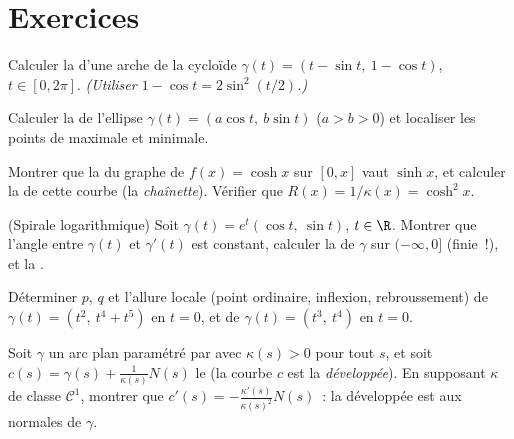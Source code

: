 \section{Exercices}

\begin{exercise}[$\star$]\label{exo:b2:curves:1}
Calculer la  d'une arche de la cycloïde $\gamma(t) = (t -
\sin t,\ 1 - \cos t)$, $t \in [0, 2\pi]$. \emph{(Utiliser $1 - \cos t =
2\sin^2(t/2)$.)}
\end{exercise}

\begin{exercise}[$\star$]\label{exo:b2:curves:2}
Calculer la  de l'ellipse $\gamma(t) = (a\cos t,\ b\sin
t)$ ($a > b > 0$) et localiser les points de  maximale et
minimale.
\end{exercise}

\begin{exercise}[$\star$]\label{exo:b2:curves:3}
Montrer que la  du graphe de $f(x) = \cosh x$ sur
$[0, x]$ vaut $\sinh x$, et calculer la  de cette
courbe (la \emph{chaînette}). Vérifier que $R(x) = 1/\kappa(x) =
\cosh^2 x$.
\end{exercise}

\begin{exercise}[$\star\star$]\label{exo:b2:curves:4}
(Spirale logarithmique) Soit $\gamma(t) = e^{t}(\cos t,\ \sin t)$, $t
\in \R$.
Montrer que l'angle entre $\gamma(t)$ et $\gamma'(t)$ est
constant, calculer la  de $\gamma$ sur $(-\infty, 0]$
(finie~!), et la .
\end{exercise}

\begin{exercise}[$\star\star$]\label{exo:b2:curves:5}
Déterminer $p$, $q$ et l'allure locale (point ordinaire,
inflexion, rebroussement) de $\gamma(t) = (t^2,\ t^4 + t^5)$ en $t = 0$, et de
$\gamma(t) = (t^3,\ t^4)$ en $t = 0$.
\end{exercise}

\begin{exercise}[$\star\star$]\label{exo:b2:curves:6}
Soit $\gamma$ un arc plan paramétré par  avec
$\kappa(s) > 0$ pour
tout $s$, et soit $c(s) = \gamma(s) + \frac{1}{\kappa(s)}N(s)$ le
 (la courbe $c$ est la \emph{développée}).
En supposant $\kappa$ de classe $\mathcal{C}^1$, montrer que $c'(s) =
-\frac{\kappa'(s)}{\kappa(s)^2}N(s)$~: la développée est 
aux normales de $\gamma$.
\end{exercise}

